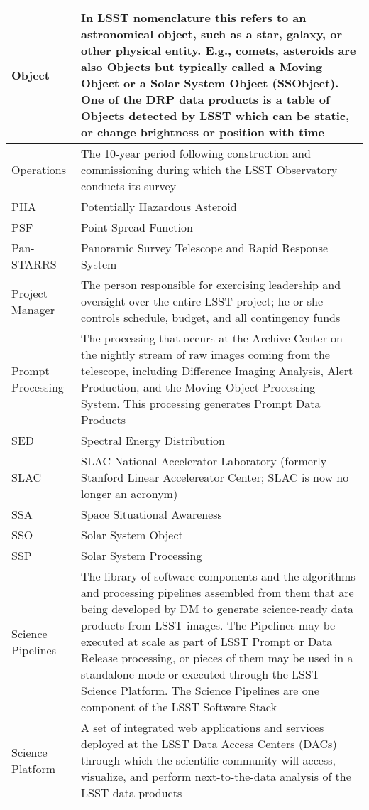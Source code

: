 \begin{longtable}{|p{}|p{}|}
Object & In \gls{LSST} nomenclature this refers to an \gls{astronomical object}, such as a star, galaxy, or other physical entity. E.g., comets, asteroids are also Objects but typically called a Moving \gls{Object} or a Solar System \gls{Object} (SSObject). One of the \gls{DRP} data products is a table of Objects detected by \gls{LSST} which can be static, or change brightness or position with time \\\hline
Operations & The 10-year period following construction and commissioning during which the \gls{LSST} Observatory conducts its survey \\\hline
PHA & Potentially Hazardous Asteroid \\\hline
PSF & Point Spread Function \\\hline
Pan-STARRS & Panoramic Survey Telescope and Rapid Response System \\\hline
Project Manager & The person responsible for exercising leadership and oversight over the entire \gls{LSST} project; he or she controls schedule, budget, and all contingency funds \\\hline
Prompt Processing & The processing that occurs at the \gls{Archive} \gls{Center} on the nightly stream of raw images coming from the telescope, including Difference Imaging Analysis, \gls{Alert} Production, and the \gls{Moving Object Processing System}. This processing generates Prompt Data Products \\\hline
SED & \gls{Spectral Energy Distribution} \\\hline
SLAC & \gls{SLAC} National Accelerator Laboratory (formerly Stanford Linear Accelereator \gls{Center}; \gls{SLAC} is now no longer an acronym) \\\hline
SSA & Space Situational Awareness \\\hline
SSO & Solar System \gls{Object} \\\hline
SSP & Solar System Processing \\\hline
Science Pipelines & The library of software components and the algorithms and processing pipelines assembled from them that are being developed by \gls{DM} to generate science-ready data products from \gls{LSST} images. The Pipelines may be executed at scale as part of \gls{LSST} Prompt or \gls{Data Release} processing, or pieces of them may be used in a standalone mode or executed through the \gls{LSST} \gls{Science Platform}. The \gls{Science Pipelines} are one component of the \gls{LSST} \gls{Software Stack} \\\hline
Science Platform & A set of integrated web applications and services deployed at the \gls{LSST} Data Access Centers (DACs) through which the scientific community will access, visualize, and perform next-to-the-data analysis of the \gls{LSST} data products \\\hline

\end{longtable}
